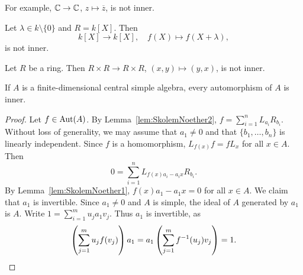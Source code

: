For example, $\mathbb{C}\to\mathbb{C}$, $z\mapsto\overline{z}$, is not inner.

\begin{example}
	Let $\lambda\in k\setminus\{0\}$ and $R=k[X]$. Then 
 \[
 k[X]\to
	k[X],\quad f(X)\mapsto f(X+\lambda),
 \]
 is not inner. 
\end{example}

\begin{example}
	Let $R$ be a ring. Then $R\times R\to R\times R$, $(x,y)\mapsto
	(y,x)$, is not inner. 
\end{example}

\begin{theorem}
	\label{thm:SkolemNoether}
	If $A$ is a finite-dimensional central simple algebra, 
        every automorphism of $A$ is inner. 
\end{theorem}

\begin{proof}	
	Let $f\in\operatorname{Aut}(A)$. By Lemma~\ref{lem:SkolemNoether2}, 
	$f=\sum_{i=1}^n	L_{a_i}R_{b_i}$. 
	Without loss of generality, we may assume that  $a_1\ne 0$ and 
	that $\{b_1,\dots,b_n\}$ is linearly independent. 
	Since $f$ is a homomorphism, 
 	$L_{f(x)}f=fL_x$ for all $x\in A$. Then 
	\[
		0=\sum_{i=1}^n L_{f(x)a_i-a_ix}R_{b_i}. 
	\]
	By Lemma~\ref{lem:SkolemNoether1}, $f(x)a_1-a_1x=0$ for all 
	$x\in A$. We claim that $a_1$ is invertible. 
	Since $a_1\ne 0$ and $A$ is simple, the ideal of $A$ generated by $a_1$ is $A$.
        Write $1=\sum_{i=1}^m u_ja_1v_j$. Thus $a_1$ is invertible, 
        as  
	\[
		\left(\sum_{j=1}^m u_jf(v_j)\right)a_1=a_1\left(\sum_{j=1}^m f^{-1}(u_j)v_j\right)=1.\qedhere
	\]
\end{proof}


